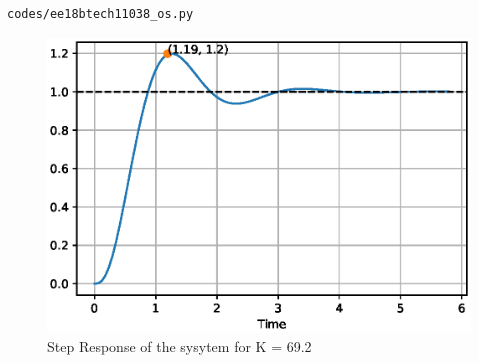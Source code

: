 \begin{enumerate}[label=\thesubsection.\arabic*.,ref=\thesubsection.\theenumi]
\begin{lstlisting}
codes/ee18btech11038_os.py
\end{lstlisting}

\begin{figure}[!h]
\centering
\includegraphics[width=\columnwidth]{./figs/ee18btech11038_os.eps}
\caption{Step Response of the sysytem for K = 69.2}
\label{fig:ee18btech11038_os}
\end{figure}
\end{enumerate}